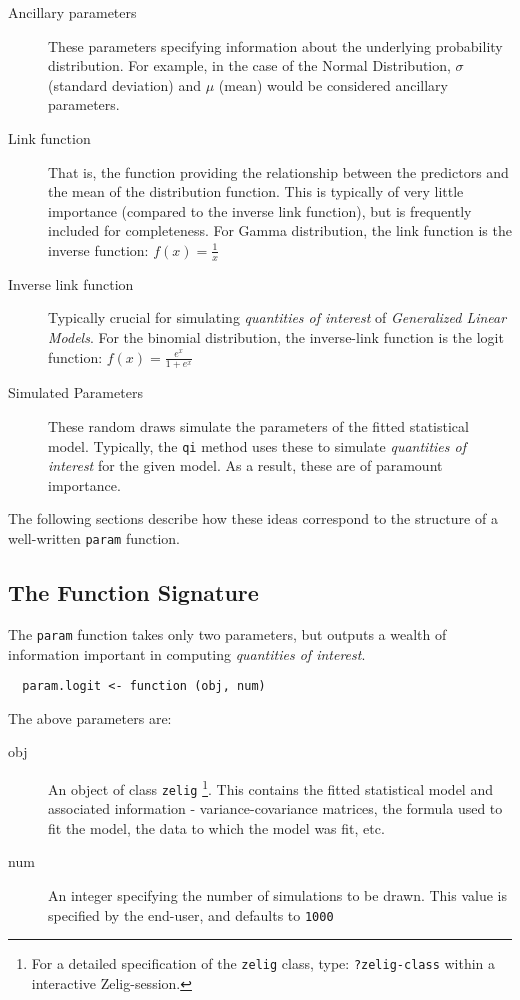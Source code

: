 \documentclass{article}
\newcommand{\code}[1]{{\tt #1}}
\begin{document}
\begin{description}

	\item[Ancillary parameters] These parameters specifying information about the
		underlying probability distribution. For example, in the case of the Normal
		Distribution, $\sigma$ (standard deviation) and $\mu$ (mean) would be considered ancillary parameters.
	
	\item[Link function] That is, the function providing the relationship between
		the predictors and the mean of the distribution function. This is typically of
		very little importance (compared to the inverse link function), but is frequently included for completeness. For Gamma distribution, the link function is the inverse function: $ f(x) = \frac{1}{x} $
	
	\item[Inverse link function] Typically crucial for simulating \emph{quantities of
		interest} of \emph{Generalized Linear Models}. For the binomial distribution, the inverse-link function is the logit function: $ f(x) = \frac{e^x}{1+e^x} $
	
	\item[Simulated Parameters] These random draws simulate the parameters of the fitted statistical model. Typically, the \code{qi} method uses these to simulate \emph{quantities of interest} for the given model. As a result, these are of paramount importance.

\end{description}

\noindent The following sections describe how these ideas correspond to the structure of a well-written
\code{param} function.

\subsection{The Function Signature}

The \code{param} function takes only two parameters, but outputs a wealth of information important in computing \emph{quantities of interest}.

\begin{verbatim}
  param.logit <- function (obj, num)
\end{verbatim}

\noindent The above parameters are:

\begin{description}
	\item[obj] An object of class \code{zelig}
		\footnote{
		For a detailed specification of the \code{zelig} class, type: \code{?zelig-class} within a interactive Zelig-session.
		}. This contains the fitted statistical model and associated information - variance-covariance matrices, the formula used to fit the model, the data to which the model was fit, etc.
	\item[num] An integer specifying the number of simulations to be drawn. This value is specified by the end-user, and defaults to \code{1000}
\end{description}
\end{document}
